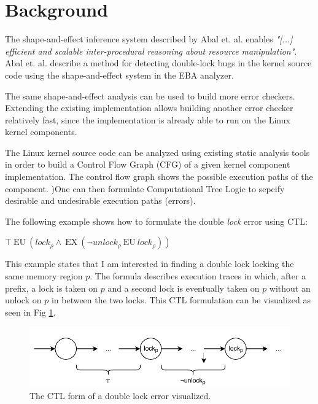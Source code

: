\section{Background}

The shape-and-effect inference system described by Abal et. al. \cite{Abal2017EffectiveBF} enables \textit{"[...] efficient and scalable inter-procedural reasoning about resource manipulation"}. Abal et. al. describe a method for detecting double-lock bugs in the kernel source code using the shape-and-effect system in the EBA analyzer.

\newpar The same shape-and-effect analysis can be used to build more error checkers. Extending the existing implementation allows building another error checker relatively fast, since the implementation is already able to run on the Linux kernel components.

\newpar The Linux kernel source code can be analyzed using existing static analysis tools in order to build a Control Flow Graph (CFG) of a given kernel component implementation. The control flow graph shows the possible execution paths of the component. )One can then formulate Computational Tree Logic to sepcify desirable and undesirable execution paths (errors). 

\newpar The following example shows how to formulate the double \textit{lock} error using CTL: 

\begin{center}
    $\top\:\mathrm{EU}\:\left({l o c k}_{\rho} \wedge\:\mathrm{EX}\:\left(\neg {u n l o c k}_{\rho}\:\mathrm{EU}\:{l o c k}_{\rho}\right)\right)$
\end{center}

\newpar This example states that I am interested in finding a double lock locking the same memory region $p$. The formula describes execution traces in which, after a prefix, a lock is taken on $p$ and a second lock is eventually taken on $p$ without an unlock on $p$ in between the two locks. This CTL formulation can be visualized as seen in Fig \ref{fig:doublelock}.

\begin{figure}[h]
    \centering
    \includegraphics{background/figures/doublelock}
    \caption{The CTL form of a double lock error visualized.}
    \label{fig:doublelock}
\end{figure}

